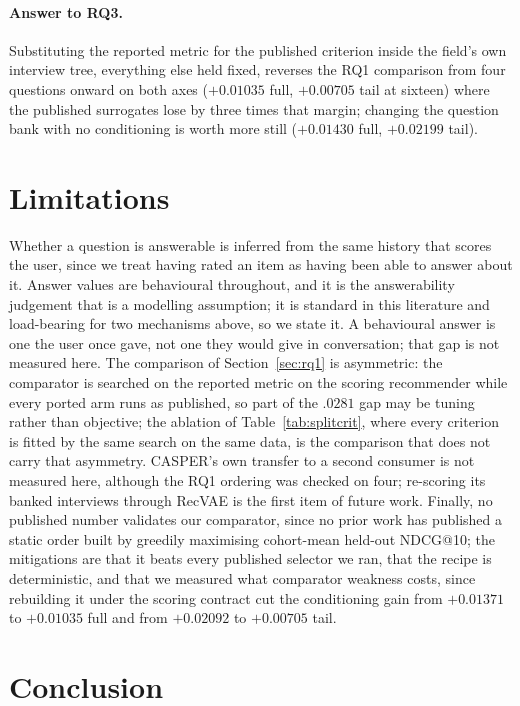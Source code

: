 \documentclass[runningheads]{llncs}
\begin{document}
\paragraph{Answer to RQ3.}
Substituting the reported metric for the published criterion inside the field's own interview tree,
everything else held fixed, reverses the RQ1 comparison from four questions onward on both axes
($+0.01035$ full, $+0.00705$ tail at sixteen) where the published surrogates lose by three times that
margin; changing the question bank with no conditioning is worth more still ($+0.01430$ full,
$+0.02199$ tail).

\section{Limitations}
\label{sec:limits}

Whether a question is answerable is inferred from the same history that scores the user, since we
treat having rated an item as having been able to answer about it. Answer values are behavioural
throughout, and it is the answerability judgement that is a modelling assumption; it is standard in
this literature and load-bearing for two mechanisms above, so we state it. A behavioural answer is
one the user once gave, not one they would give in conversation; that gap is not measured here. The comparison of Section~\ref{sec:rq1} is asymmetric: the comparator is searched on the
reported metric on the scoring recommender while every ported arm runs as published, so part of the
$.0281$ gap may be tuning rather than objective; the ablation of Table~\ref{tab:splitcrit}, where
every criterion is fitted by the same search on the same data, is the comparison that does not carry
that asymmetry. CASPER's own transfer to a second consumer is not measured here, although the RQ1
ordering was checked on four; re-scoring its banked interviews through RecVAE is the first item of
future work. Finally, no published number validates our comparator, since no prior work has published a static order built by greedily
maximising cohort-mean held-out NDCG@10; the mitigations are that it beats every published selector we
ran, that the recipe is deterministic, and that we measured what comparator weakness costs, since
rebuilding it under the scoring contract cut the conditioning gain from $+0.01371$ to $+0.01035$ full
and from $+0.02092$ to $+0.00705$ tail.

\section{Conclusion}
\label{sec:conclusion}
\end{document}
